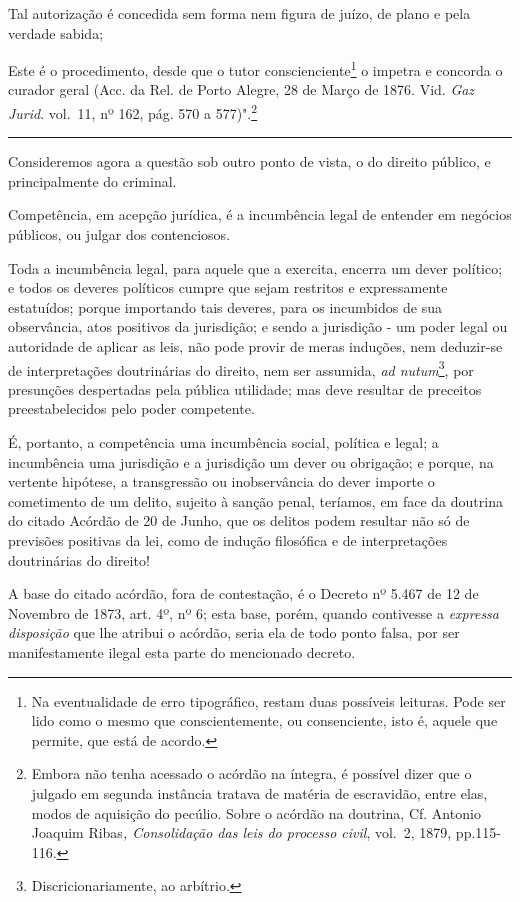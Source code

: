 Tal autorização é concedida sem forma nem figura de juízo, de plano e
pela verdade sabida;

Este é o procedimento, desde que o tutor conscienciente\footnote{Na
  eventualidade de erro tipográfico, restam duas possíveis leituras.
  Pode ser lido como o mesmo que conscientemente, ou consenciente, isto
  é, aquele que permite, que está de acordo.} o impetra e concorda o
curador geral (Acc. da Rel. de Porto Alegre, 28 de Março de 1876. Vid.
\emph{Gaz Jurid}. vol.~11, nº 162, pág. 570 a 577)".\footnote{Embora não
  tenha acessado o acórdão na íntegra, é possível dizer que o julgado em
  segunda instância tratava de matéria de escravidão, entre elas, modos
  de aquisição do pecúlio. Sobre o acórdão na doutrina, Cf. Antonio
  Joaquim Ribas\emph{, Consolidação das leis do processo civil}, vol.~2,
  1879, pp.115-116.}

\begin{center}\rule{0.5\linewidth}{\linethickness}\end{center}

Consideremos agora a questão sob outro ponto de vista, o do direito
público, e principalmente do criminal.

Competência, em acepção jurídica, é a incumbência legal de entender em
negócios públicos, ou julgar dos contenciosos.

Toda a incumbência legal, para aquele que a exercita, encerra um dever
político; e todos os deveres políticos cumpre que sejam restritos e
expressamente estatuídos; porque importando tais deveres, para os
incumbidos de sua observância, atos positivos da jurisdição; e sendo a
jurisdição - um poder legal ou autoridade de aplicar as leis, não pode
provir de meras induções, nem deduzir-se de interpretações doutrinárias
do direito, nem ser assumida, \emph{ad nutum}\footnote{Discricionariamente,
  ao arbítrio.}, por presunções despertadas pela pública utilidade; mas
deve resultar de preceitos preestabelecidos pelo poder competente.

É, portanto, a competência uma incumbência social, política e legal; a
incumbência uma jurisdição e a jurisdição um dever ou obrigação; e
porque, na vertente hipótese, a transgressão ou inobservância do dever
importe o cometimento de um delito, sujeito à sanção penal, teríamos, em
face da doutrina do citado Acórdão de 20 de Junho, que os delitos podem
resultar não só de previsões positivas da lei, como de indução
filosófica e de interpretações doutrinárias do direito!

A base do citado acórdão, fora de contestação, é o Decreto nº 5.467 de
12 de Novembro de 1873, art. 4º, nº 6; esta base, porém, quando
contivesse a \emph{expressa disposição} que lhe atribui o acórdão, seria
ela de todo ponto falsa, por ser manifestamente ilegal esta parte do
mencionado decreto.

